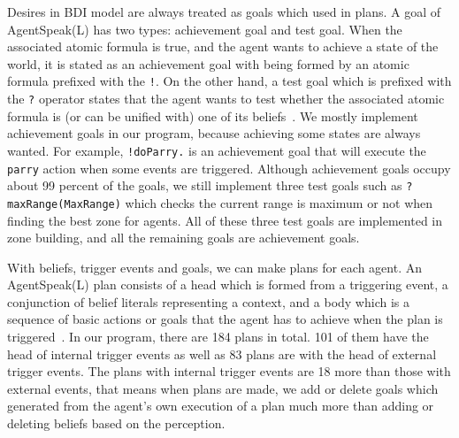 Desires in BDI model are always treated as goals which used in plans. A goal of AgentSpeak(L) has two types: achievement goal and test goal. When the associated atomic formula is true, and the agent wants to achieve a state of the world, it is stated as an achievement goal with being formed by an atomic formula prefixed with the \texttt{!}. On the other hand, a test goal which is prefixed with the \texttt{?} operator states that the agent wants to test whether the associated atomic formula is (or can be unified with) one of its beliefs~\cite{rafael_BDIAgent_2005}. We mostly implement achievement goals in our program, because achieving some states are always wanted. For example, \texttt{!doParry.} is an achievement goal that will execute the \texttt{parry} action when some events are triggered. Although achievement goals occupy about 99 percent of the goals, we still implement three test goals such as \texttt{?maxRange(MaxRange)} which checks the current range is maximum or not when finding the best zone for agents. All of these three test goals are implemented in zone building, and all the remaining goals are achievement goals.

With beliefs, trigger events and goals, we can make plans for each agent. An AgentSpeak(L) plan consists of a head which is formed from a triggering event, a conjunction of belief literals representing a context, and a body which is a sequence of basic actions or goals that the agent has to achieve when the plan is triggered~\cite{rafael_BDIAgent_2005}. In our program, there are 184 plans in total. 101 of them have the head of internal trigger events as well as 83 plans are with the head of external trigger events. The plans with internal trigger events are 18 more than those with external events, that means when plans are made, we add or delete goals which generated from the agent's own execution of a plan much more than adding or deleting beliefs based on the perception.

